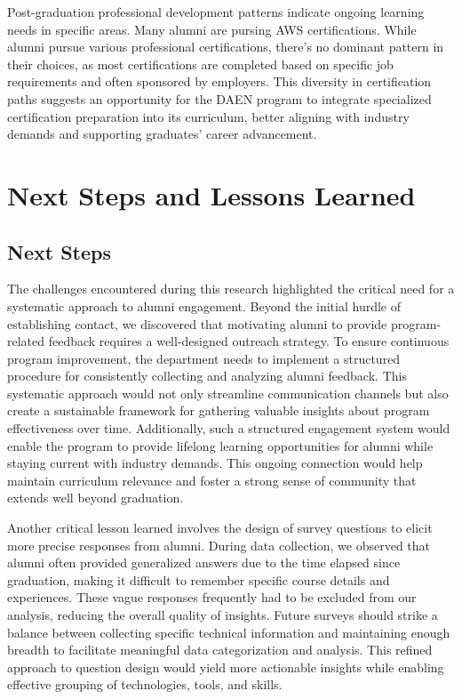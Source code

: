 \documentclass[12pt,a4paper]{article}
\begin{document}
Post-graduation professional development patterns indicate ongoing learning needs in specific areas. Many alumni are pursing AWS certifications. While alumni pursue various professional certifications, there's no dominant pattern in their choices, as most certifications are completed based on specific job requirements and often sponsored by employers. This diversity in certification paths suggests an opportunity for the DAEN program to integrate specialized certification preparation into its curriculum, better aligning with industry demands and supporting graduates' career advancement.


\section{Next Steps and Lessons Learned}
\subsection{Next Steps}
The challenges encountered during this research highlighted the critical need for a systematic approach to alumni engagement. Beyond the initial hurdle of establishing contact, we discovered that motivating alumni to provide program-related feedback requires a well-designed outreach strategy. To ensure continuous program improvement, the department needs to implement a structured procedure for consistently collecting and analyzing alumni feedback. This systematic approach would not only streamline communication channels but also create a sustainable framework for gathering valuable insights about program effectiveness over time. Additionally, such a structured engagement system would enable the program to provide lifelong learning opportunities for alumni while staying current with industry demands. This ongoing connection would help maintain curriculum relevance and foster a strong sense of community that extends well beyond graduation.


Another critical lesson learned involves the design of survey questions to elicit more precise responses from alumni. During data collection, we observed that alumni often provided generalized answers due to the time elapsed since graduation, making it difficult to remember specific course details and experiences. These vague responses frequently had to be excluded from our analysis, reducing the overall quality of insights. Future surveys should strike a balance between collecting specific technical information and maintaining enough breadth to facilitate meaningful data categorization and analysis. This refined approach to question design would yield more actionable insights while enabling effective grouping of technologies, tools, and skills.
\end{document}
